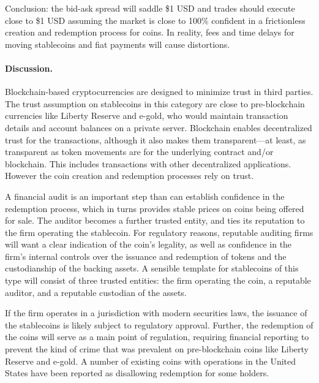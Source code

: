 Conclusion: the bid-ask spread will saddle \$1 USD and trades should execute close to \$1 USD assuming the market is close to 100\% confident in a frictionless creation and redemption process for coins. In reality, fees and time delays for moving stablecoins and fiat payments will cause distortions.

\paragraph{Discussion.} Blockchain-based cryptocurrencies are designed to minimize trust in third parties. The trust assumption on stablecoins in this category are close to pre-blockchain currencies like Liberty Reserve and e-gold, who would maintain transaction details and account balances on a private server. Blockchain enables decentralized trust for the transactions, although it also makes them transparent---at least, as transparent as token movements are for the underlying contract and/or blockchain. This includes transactions with other decentralized applications. However the coin creation and redemption processes rely on trust.

A financial audit is an important step than can establish confidence in the redemption process, which in turns provides stable prices on coins being offered for sale. The auditor becomes a further trusted entity, and ties its reputation to the firm operating the stablecoin. For regulatory reasons, reputable auditing firms will want a clear indication of the coin's legality, as well as confidence in the firm's internal controls over the issuance and redemption of tokens and the custodianship of the backing assets. A sensible template for stablecoins of this type will consist of three trusted entities: the firm operating the coin, a reputable auditor, and a reputable custodian of the assets.

If the firm operates in a jurisdiction with modern securities laws, the issuance of the stablecoins is likely subject to regulatory approval. Further, the redemption of the coins will serve as a main point of regulation, requiring financial reporting to prevent the kind of crime that was prevalent on pre-blockchain coins like Liberty Reserve and e-gold. A number of existing coins with operations in the United States have been reported as disallowing redemption for some holders.



